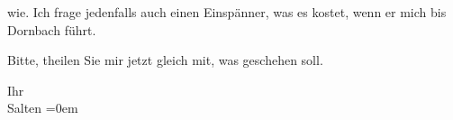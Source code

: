                wie. Ich frage jedenfalls auch einen Einspänner, was es kostet, wenn er mich bis Dornbach führt.\pend
           
\pstart
           Bitte, theilen Sie mir jetzt gleich mit, was geschehen soll.\pend
           
\pstart
           Ihr {\\[\baselineskip]}\spacefill\mbox{Salten}\pend
           \leftskip=0em{}\endnumbering{}  
      